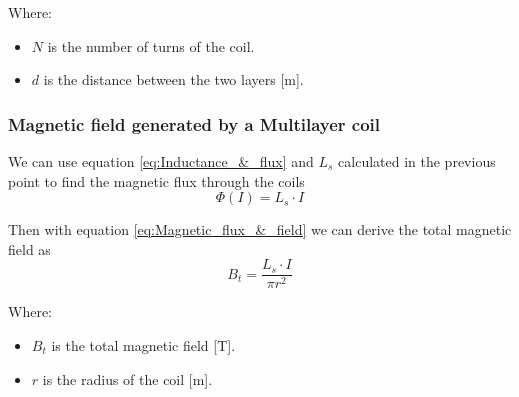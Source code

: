 Where:
\begin{itemize}
    \item \( N \) is the number of turns of the coil.
    \item \( d \) is the distance between the two layers [m].
\end{itemize}

\subsubsection{Magnetic field generated by a Multilayer coil}
We can use equation \ref{eq:Inductance_&_flux} and $L_s$ calculated in the previous point to find the magnetic flux through the coils
\begin{equation}
    \Phi(I) = L_s \cdot I
\end{equation}

Then with equation \ref{eq:Magnetic_flux_&_field} we can derive the total magnetic field as
\begin{equation}
    B_t = \frac{L_s \cdot I}{\pi r^2}
\end{equation}

Where:
\begin{itemize}
    \item \( B_t \) is the total magnetic field [T].
    \item \( r \) is the radius of the coil [m].
\end{itemize}




